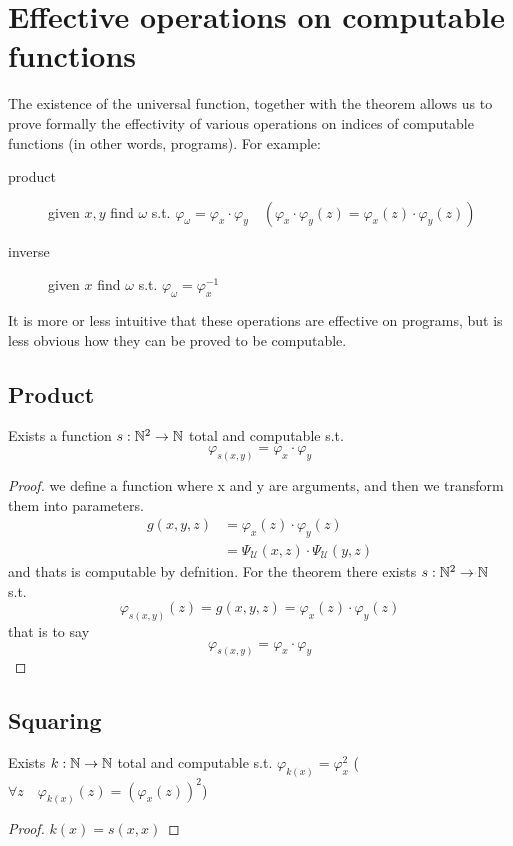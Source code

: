 \section{Effective operations on computable functions}
The existence of the universal function, together with the \smn
theorem allows us to prove formally the effectivity of various
operations on indices of computable functions (in other words,
programs). For example:
\begin{description}
\item[product] given $x,y$ find $\omega$ s.t.
  $\varphi_\omega = \varphi_x \cdot \varphi_y \quad(\varphi_x\cdot
  \varphi_y(z) = \varphi_x(z) \cdot \varphi_y(z))$
\item[inverse] given $x$ find $\omega$ s.t.
  $\varphi_\omega = \varphi_x^{-1}$
\end{description}
It is more or less intuitive that these operations are effective on
programs, but is less obvious how they can be proved to be computable.
\subsection{Product}
Exists a function $s: \mathbb{N}^2 \rightarrow \mathbb{N}$ total and computable
s.t. \[\varphi_{s(x,y)} = \varphi_x \cdot \varphi_y\]
\begin{proof}
  we define a function where x and y are arguments, and then we
  transform them into parameters.
  \[
    \begin{split}
      g(x,y,z) &= \varphi_x(z) \cdot \varphi_y(z) \\
      &= \Psi_{\mathcal{U}}(x,z) \cdot \Psi_{\mathcal{U}}(y,z)
    \end{split}
  \]
  and thats is computable by defnition. For the \smn theorem there
  exists $s: \mathbb{N}^2 \rightarrow \mathbb{N}$ s.t.
  \[
    \varphi_{s(x,y)}(z) = g(x,y,z) = \varphi_x(z) \cdot \varphi_y(z)
  \]
  that is to say
  \[
    \varphi_{s(x,y)} = \varphi_x \cdot \varphi_y
  \]
\end{proof}

\subsection{Squaring}
Exists $k:\mathbb{N} \rightarrow \mathbb{N}$ total and computable s.t.
$\varphi_{k(x)} = \varphi_x^2$
($\forall z \quad \varphi_{k(x)}(z) = (\varphi_x(z))^2$)
\begin{proof}
$k(x) = s(x,x)$
\end{proof}

